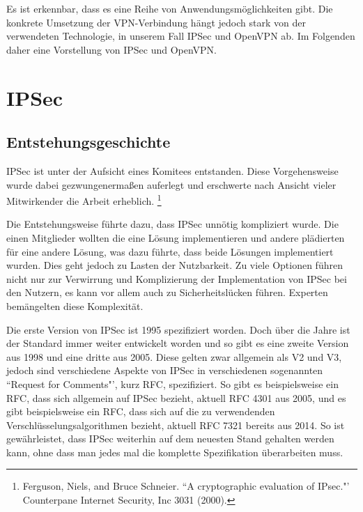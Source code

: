 \documentclass[12pt]{scrartcl}
\begin{document}
Es ist erkennbar, dass es eine Reihe von Anwendungsmöglichkeiten gibt. Die konkrete Umsetzung der VPN-Verbindung hängt jedoch stark von der verwendeten Technologie, in unserem Fall IPSec und OpenVPN ab. Im Folgenden daher eine Vorstellung von IPSec und OpenVPN.

\section{IPSec}
\subsection{Entstehungsgeschichte}
IPSec ist unter der Aufsicht eines Komitees entstanden. Diese Vorgehensweise wurde dabei gezwungenermaßen auferlegt und erschwerte nach Ansicht vieler Mitwirkender die Arbeit erheblich. \footnote{Ferguson, Niels, and Bruce Schneier. ``A cryptographic evaluation of IPsec."' Counterpane Internet Security, Inc 3031 (2000).} 

Die Entstehungsweise führte dazu, dass IPSec unnötig kompliziert wurde. Die einen Mitglieder wollten die eine Lösung implementieren und andere plädierten für eine andere Lösung, was dazu führte, dass beide Lösungen implementiert wurden. Dies geht jedoch zu Lasten der Nutzbarkeit. Zu viele Optionen führen nicht nur zur Verwirrung und Komplizierung der Implementation von IPSec bei den Nutzern, es kann vor allem auch zu Sicherheitslücken führen. Experten bemängelten diese Komplexität.

Die erste Version von IPSec ist 1995\cite{RFC1825} spezifiziert worden. Doch über die Jahre ist der Standard immer weiter entwickelt worden und so gibt es eine zweite Version aus 1998\cite{RFC2401} und eine dritte aus 2005\cite{RFC4301}. Diese gelten zwar allgemein als V2 und V3, jedoch sind verschiedene Aspekte von IPSec in verschiedenen sogenannten ``Request for Comments"', kurz RFC, spezifiziert. So gibt es beispielsweise ein RFC, dass sich allgemein auf IPSec bezieht, aktuell RFC 4301 aus 2005, und es gibt beispielsweise ein RFC, dass sich auf die zu verwendenden Verschlüsselungsalgorithmen bezieht, aktuell RFC 7321 bereits aus 2014. So ist gewährleistet, dass IPSec weiterhin auf dem neuesten Stand gehalten werden kann, ohne dass man jedes mal die komplette Spezifikation überarbeiten muss.
\end{document}
